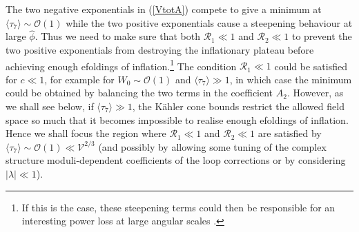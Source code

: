 \documentclass[11pt,a4paper]{article}
\newcommand\vo{{\mathcal{V}}}
\newcommand{\mc}{\mathcal}
\begin{document}
The two negative exponentials in (\ref{VtotA}) compete to give a minimum at $\langle\tau_7\rangle \sim\mc{O}(1)$ while the two positive exponentials cause a steepening behaviour at large $\hat\phi$. Thus we need to make sure that both $\mc{R}_1\ll 1$ and $\mc{R}_2\ll 1$ to prevent the two positive exponentials from destroying the inflationary plateau before achieving enough efoldings of inflation.\footnote{If this is the case, these steepening terms could then be responsible for an interesting power loss at large angular scales \cite{Cicoli:2013oba}.} The condition $\mc{R}_1\ll 1$ could be satisfied for $c\ll 1$, for example for $W_0\sim\mc{O}(1)$ and $\langle\tau_7\rangle \gg 1$, in which case the minimum could be obtained by balancing the two terms in the coefficient $A_2$. However, as we shall see below, if $\langle\tau_7\rangle \gg 1$, the K\"ahler cone bounds restrict the allowed field space so much that it becomes impossible to realise enough efoldings of inflation. Hence we shall focus the region where $\mc{R}_1\ll 1$ and $\mc{R}_2\ll 1$ are satisfied by $\langle\tau_7\rangle\sim \mc{O}(1)\ll\vo^{2/3}$ (and possibly by allowing some tuning of the complex structure moduli-dependent coefficients of the loop corrections or by considering $|\lambda|\ll 1$).  
\end{document}
